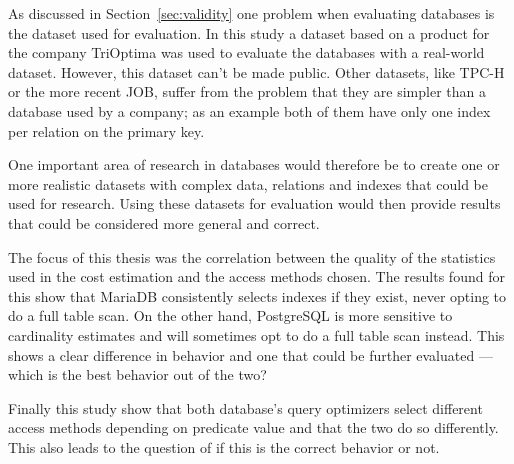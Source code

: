 As discussed in Section~\ref{sec:validity} one problem when evaluating
databases is the dataset used for evaluation. In this study a dataset based on a
product for the company TriOptima was used to evaluate the databases with a real-world
dataset. However, this dataset can't be made public. Other datasets, like TPC-H
or the more recent JOB, suffer from the problem that they are simpler
than a database used by a company; as an example both of them have only one
index per relation on the primary key.

One important area of research in databases would therefore be to create one or
more realistic datasets with complex data, relations and indexes that could be
used for research. Using these datasets for evaluation would then provide
results that could be considered more general and correct.

The focus of this thesis was the correlation between the quality of the
statistics used in the cost estimation and the access methods chosen. The
results found for this show that MariaDB consistently selects indexes if they
exist, never opting to do a full table scan. On the other hand, PostgreSQL is more
sensitive to cardinality estimates and will sometimes opt to do a full table
scan instead. This shows a clear difference in behavior and one that could be
further evaluated --- which is the best behavior out of the two?

Finally this study show that both database's query optimizers select
different access methods depending on predicate value and that the two do so
differently. This also leads to the question of if this is the correct behavior
or not.
